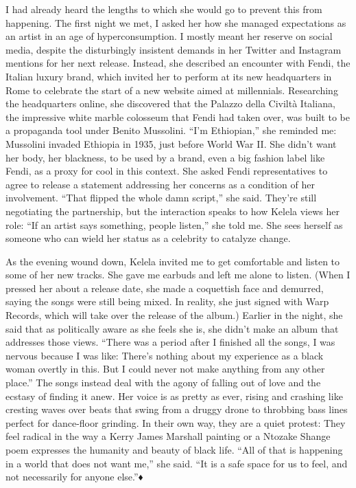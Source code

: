 I had already heard the lengths to which she would go to prevent this
from happening. The first night we met, I asked her how she managed
expectations as an artist in an age of hyperconsumption. I mostly meant
her reserve on social media, despite the disturbingly insistent demands
in her Twitter and Instagram mentions for her next release. Instead, she
described an encounter with Fendi, the Italian luxury brand, which
invited her to perform at its new headquarters in Rome to celebrate the
start of a new website aimed at millennials. Researching the
headquarters online, she discovered that the Palazzo della Civiltà
Italiana, the impressive white marble colosseum that Fendi had taken
over, was built to be a propaganda tool under Benito Mussolini. ``I'm
Ethiopian,'' she reminded me: Mussolini invaded Ethiopia in 1935, just
before World War II. She didn't want her body, her blackness, to be used
by a brand, even a big fashion label like Fendi, as a proxy for cool in
this context. She asked Fendi representatives to agree to release a
statement addressing her concerns as a condition of her involvement.
``That flipped the whole damn script,'' she said. They're still
negotiating the partnership, but the interaction speaks to how Kelela
views her role: ``If an artist says something, people listen,'' she told
me. She sees herself as someone who can wield her status as a celebrity
to catalyze change.

As the evening wound down, Kelela invited me to get comfortable and
listen to some of her new tracks. She gave me earbuds and left me alone
to listen. (When I pressed her about a release date, she made a
coquettish face and demurred, saying the songs were still being mixed.
In reality, she just signed with Warp Records, which will take over the
release of the album.) Earlier in the night, she said that as
politically aware as she feels she is, she didn't make an album that
addresses those views. ``There was a period after I finished all the
songs, I was nervous because I was like: There's nothing about my
experience as a black woman overtly in this. But I could never not make
anything from any other place.'' The songs instead deal with the agony
of falling out of love and the ecstasy of finding it anew. Her voice is
as pretty as ever, rising and crashing like cresting waves over beats
that swing from a druggy drone to throbbing bass lines perfect for
dance-floor grinding. In their own way, they are a quiet protest: They
feel radical in the way a Kerry James Marshall painting or a Ntozake
Shange poem expresses the humanity and beauty of black life. ``All of
that is happening in a world that does not want me,'' she said. ``It is
a safe space for us to feel, and not necessarily for anyone else.''♦


